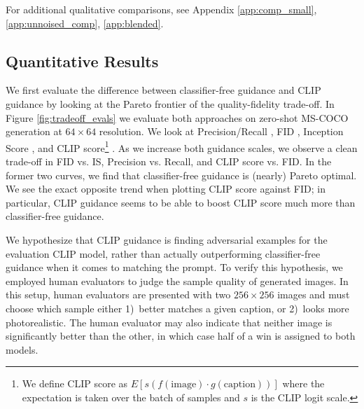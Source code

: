\documentclass{article}
\begin{document}
For additional qualitative comparisons, see Appendix \ref{app:comp_small}, \ref{app:unnoised_comp}, \ref{app:blended}. 

\subsection{Quantitative Results}
\label{sec:quantitative_results}

We first evaluate the difference between classifier-free guidance and CLIP guidance by looking at the Pareto frontier of the quality-fidelity trade-off. In Figure \ref{fig:tradeoff_evals} we evaluate both approaches on zero-shot MS-COCO generation at $64 \times 64$ resolution. We look at Precision/Recall \mbox{\citep{precrecall}}, FID \mbox{\citep{fid}}, Inception Score \mbox{\citep{inceptionscore}}, and CLIP score\footnote{We define CLIP score as $E[s (f(\textrm{image})\cdot g(\textrm{caption}))]$ where the expectation is taken over the batch of samples and $s$ is the CLIP logit scale.} \citep{clip}. As we increase both guidance scales, we observe a clean trade-off in FID vs. IS, Precision vs. Recall, and CLIP score vs. FID. In the former two curves, we find that classifier-free guidance is (nearly) Pareto optimal. We see the exact opposite trend when plotting CLIP score against FID; in particular, CLIP guidance seems to be able to boost CLIP score much more than classifier-free guidance.

We hypothesize that CLIP guidance is finding adversarial examples for the evaluation CLIP model, rather than actually outperforming classifier-free guidance when it comes to matching the prompt. To verify this hypothesis, we employed human evaluators to judge the sample quality of generated images. In this setup, human evaluators are presented with two $256 \times 256$ images and must choose which sample either 1)~better matches a given caption, or 2)~looks more photorealistic. The human evaluator may also indicate that neither image is significantly better than the other, in which case half of a win is assigned to both models.
\end{document}
